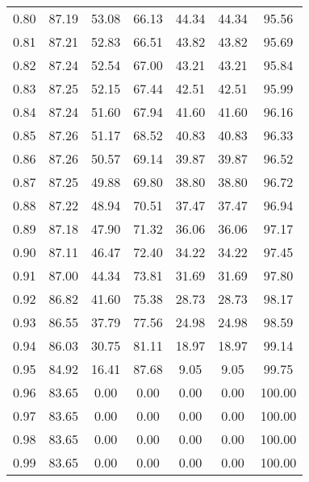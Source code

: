 \begin{tabular}{|c|c|c|c|c|c|c|}
      0.80 &     87.19 &     53.08 &      66.13 &   44.34 &      44.34 &         95.56 \\
      0.81 &     87.21 &     52.83 &      66.51 &   43.82 &      43.82 &         95.69 \\
      0.82 &     87.24 &     52.54 &      67.00 &   43.21 &      43.21 &         95.84 \\
      0.83 &     87.25 &     52.15 &      67.44 &   42.51 &      42.51 &         95.99 \\
      0.84 &     87.24 &     51.60 &      67.94 &   41.60 &      41.60 &         96.16 \\
      0.85 &     87.26 &     51.17 &      68.52 &   40.83 &      40.83 &         96.33 \\
      0.86 &     87.26 &     50.57 &      69.14 &   39.87 &      39.87 &         96.52 \\
      0.87 &     87.25 &     49.88 &      69.80 &   38.80 &      38.80 &         96.72 \\
      0.88 &     87.22 &     48.94 &      70.51 &   37.47 &      37.47 &         96.94 \\
      0.89 &     87.18 &     47.90 &      71.32 &   36.06 &      36.06 &         97.17 \\
      0.90 &     87.11 &     46.47 &      72.40 &   34.22 &      34.22 &         97.45 \\
      0.91 &     87.00 &     44.34 &      73.81 &   31.69 &      31.69 &         97.80 \\
      0.92 &     86.82 &     41.60 &      75.38 &   28.73 &      28.73 &         98.17 \\
      0.93 &     86.55 &     37.79 &      77.56 &   24.98 &      24.98 &         98.59 \\
      0.94 &     86.03 &     30.75 &      81.11 &   18.97 &      18.97 &         99.14 \\
      0.95 &     84.92 &     16.41 &      87.68 &    9.05 &       9.05 &         99.75 \\
      0.96 &     83.65 &      0.00 &       0.00 &    0.00 &       0.00 &        100.00 \\
      0.97 &     83.65 &      0.00 &       0.00 &    0.00 &       0.00 &        100.00 \\
      0.98 &     83.65 &      0.00 &       0.00 &    0.00 &       0.00 &        100.00 \\
      0.99 &     83.65 &      0.00 &       0.00 &    0.00 &       0.00 &        100.00 \\
\bottomrule
\end{tabular}
